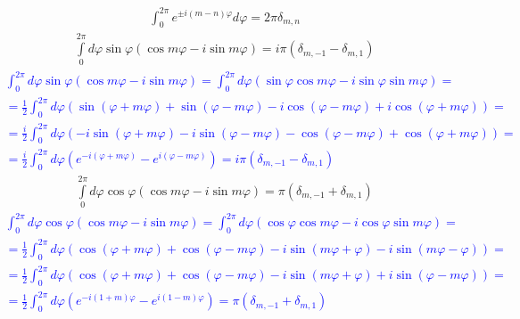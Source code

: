 \begin{equation} \begin{aligned} \label{eq:int_exp0}
\int_{0}^{2\pi} e^{\pm i (m-n) \varphi} d \varphi = 2 \pi \delta_{m,n} 
\end{aligned} \end{equation}
%
\begin{equation} \begin{aligned} \label{eq:int_exp1}
\int \limits_{0}^{2\pi} d \varphi \sin \varphi 
\left( \cos m \varphi - i \sin m \varphi \right) = 
i \pi \left( \delta_{m,-1} - \delta_{m,1} \right)
\end{aligned} \end{equation}
%
\textcolor{blue}{ \begin{equation*} \begin{aligned}
\int_{0}^{2\pi} d \varphi \sin \varphi 
\left( \cos m \varphi - i \sin m \varphi \right) = \int_{0}^{2\pi} d \varphi
\left( \sin \varphi \cos m \varphi - i \sin \varphi \sin m \varphi \right) = \\
= \frac{1}{2} \int_{0}^{2\pi} d \varphi \left( \sin (\varphi + m \varphi) + 
\sin (\varphi - m \varphi) - i \cos (\varphi - m \varphi) + 
i \cos (\varphi + m \varphi) \right) = \\
= \frac{i}{2} \int_{0}^{2\pi} d \varphi \left( -i \sin (\varphi + m \varphi) -
i \sin (\varphi - m \varphi) - \cos (\varphi - m \varphi) + 
\cos (\varphi + m \varphi) \right) = \\
= \frac{i}{2} \int_{0}^{2\pi} d \varphi \left( e^{-i (\varphi + m \varphi)} - 
e^{i (\varphi - m \varphi)} \right) = 
i \pi \left( \delta_{m,-1} - \delta_{m,1} \right)
\end{aligned} \end{equation*} }
%
\begin{equation} \begin{aligned} \label{eq:int_exp2}
\int \limits_{0}^{2\pi} d \varphi \cos \varphi 
( \cos m \varphi - i \sin m \varphi) = \pi ( \delta_{m,-1} + \delta_{m,1} )
\end{aligned} \end{equation}
%
\textcolor{blue}{ \begin{equation*} \begin{aligned}
\int_{0}^{2\pi} d \varphi \cos \varphi 
\left( \cos m \varphi - i \sin m \varphi \right) = \int_{0}^{2\pi} d \varphi
\left( \cos \varphi \cos m \varphi - i \cos \varphi \sin m \varphi \right) = \\
= \frac{1}{2} \int_{0}^{2\pi} d \varphi \left( 
\cos (\varphi + m \varphi) + \cos (\varphi - m \varphi) - 
i \sin (m \varphi + \varphi) - i \sin (m \varphi - \varphi) \right) = \\
= \frac{1}{2} \int_{0}^{2\pi} d \varphi \left( 
\cos (\varphi + m \varphi) + \cos (\varphi - m \varphi) - 
i \sin (m \varphi + \varphi) + i \sin (\varphi - m \varphi) \right) = \\
= \frac{1}{2} \int_{0}^{2\pi} d \varphi 
\left( e^{-i (1 + m) \varphi} - e^{i (1 - m) \varphi} \right) = 
\pi \left( \delta_{m,-1} + \delta_{m,1} \right)
\end{aligned} \end{equation*} }
